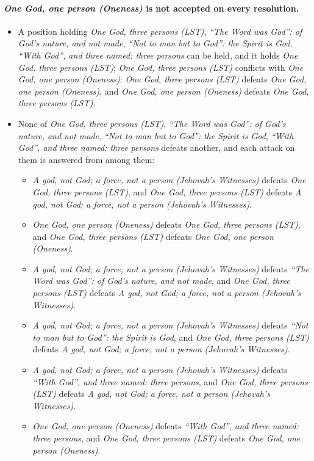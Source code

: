 \documentclass[11pt,paper=\testimonypaper,DIV=13,parskip=false]{scrartcl}
\begin{document}
\paragraph{\emph{One God, one person (Oneness)} is not accepted on every resolution.}
\begin{itemize}
\item A position holding \emph{One God, three persons (LST)}, \emph{“The Word was God”: of God’s nature, and not made}, \emph{“Not to man but to God”: the Spirit is God}, \emph{“With God”, and three named: three persons} can be held, and it holds \emph{One God, three persons (LST)}; \emph{One God, three persons (LST)} conflicts with \emph{One God, one person (Oneness)}: \emph{One God, three persons (LST)} defeats \emph{One God, one person (Oneness)}, and \emph{One God, one person (Oneness)} defeats \emph{One God, three persons (LST)}.
\item None of \emph{One God, three persons (LST)}, \emph{“The Word was God”: of God’s nature, and not made}, \emph{“Not to man but to God”: the Spirit is God}, \emph{“With God”, and three named: three persons} defeats another, and each attack on them is answered from among them:
\begin{itemize}
\item \emph{A god, not God; a force, not a person (Jehovah’s Witnesses)} defeats \emph{One God, three persons (LST)}, and \emph{One God, three persons (LST)} defeats \emph{A god, not God; a force, not a person (Jehovah’s Witnesses)}.
\item \emph{One God, one person (Oneness)} defeats \emph{One God, three persons (LST)}, and \emph{One God, three persons (LST)} defeats \emph{One God, one person (Oneness)}.
\item \emph{A god, not God; a force, not a person (Jehovah’s Witnesses)} defeats \emph{“The Word was God”: of God’s nature, and not made}, and \emph{One God, three persons (LST)} defeats \emph{A god, not God; a force, not a person (Jehovah’s Witnesses)}.
\item \emph{A god, not God; a force, not a person (Jehovah’s Witnesses)} defeats \emph{“Not to man but to God”: the Spirit is God}, and \emph{One God, three persons (LST)} defeats \emph{A god, not God; a force, not a person (Jehovah’s Witnesses)}.
\item \emph{A god, not God; a force, not a person (Jehovah’s Witnesses)} defeats \emph{“With God”, and three named: three persons}, and \emph{One God, three persons (LST)} defeats \emph{A god, not God; a force, not a person (Jehovah’s Witnesses)}.
\item \emph{One God, one person (Oneness)} defeats \emph{“With God”, and three named: three persons}, and \emph{One God, three persons (LST)} defeats \emph{One God, one person (Oneness)}.
\end{itemize}
\end{itemize}
\end{document}
